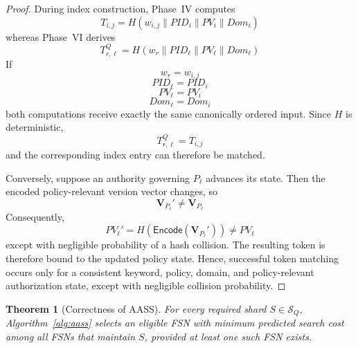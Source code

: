 \documentclass{ieeetj}
\theoremstyle{ieee-style}
\newtheorem{theorem}{Theorem}[subsection]
\begin{document}
\begin{proof}
During index construction, Phase~IV computes
\begin{equation}
T_{i,j}
=
H(w_{i,j}\parallel PID_i\parallel PV_i\parallel Dom_i)
\end{equation}
whereas Phase~VI derives
\begin{equation}
T_{r,\ell}^{Q}
=
H(w_r\parallel PID_\ell\parallel PV_\ell\parallel Dom_\ell)
\end{equation}
If
\begin{equation}
w_r=w_{i,j}
\end{equation}
\begin{equation}
PID_\ell=PID_i
\end{equation}
\begin{equation}
PV_\ell=PV_i
\end{equation}
\begin{equation}
Dom_\ell=Dom_i
\end{equation}
both computations receive exactly the same canonically ordered input.
Since $H$ is deterministic,
\begin{equation}
T_{r,\ell}^{Q}=T_{i,j}
\end{equation}
and the corresponding index entry can therefore be matched.

Conversely, suppose an authority governing $P_\ell$ advances its state.
Then the encoded policy-relevant version vector changes, so
\begin{equation}
\mathbf{V}_{P_\ell}'\neq\mathbf{V}_{P_\ell}
\end{equation}
Consequently,
\begin{equation}
PV_\ell'
=
H(\mathsf{Encode}(\mathbf{V}_{P_\ell}'))
\neq
PV_\ell
\end{equation}
except with negligible probability of a hash collision. The resulting
token is therefore bound to the updated policy state. Hence, successful
token matching occurs only for a consistent keyword, policy, domain, and
policy-relevant authorization state, except with negligible collision
probability.
\end{proof}


\begin{theorem}[Correctness of AASS]
For every required shard $S\in\mathcal{S}_Q$, Algorithm~\ref{alg:aass}
selects an eligible FSN with minimum predicted search cost among all FSNs
that maintain $S$, provided at least one such FSN exists.
\end{theorem}
\end{document}
